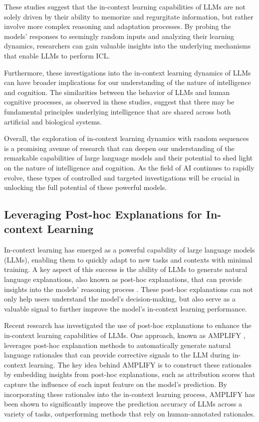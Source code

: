 \documentclass[11pt]{article}
\begin{document}
These studies suggest that the in-context learning capabilities of LLMs are not solely driven by their ability to memorize and regurgitate information, but rather involve more complex reasoning and adaptation processes. By probing the models' responses to seemingly random inputs and analyzing their learning dynamics, researchers can gain valuable insights into the underlying mechanisms that enable LLMs to perform ICL.

Furthermore, these investigations into the in-context learning dynamics of LLMs can have broader implications for our understanding of the nature of intelligence and cognition. The similarities between the behavior of LLMs and human cognitive processes, as observed in these studies, suggest that there may be fundamental principles underlying intelligence that are shared across both artificial and biological systems.

Overall, the exploration of in-context learning dynamics with random sequences is a promising avenue of research that can deepen our understanding of the remarkable capabilities of large language models and their potential to shed light on the nature of intelligence and cognition. As the field of AI continues to rapidly evolve, these types of controlled and targeted investigations will be crucial in unlocking the full potential of these powerful models.

\subsection{Leveraging Post-hoc Explanations for In-context Learning}

In-context learning has emerged as a powerful capability of large language models (LLMs), enabling them to quickly adapt to new tasks and contexts with minimal training. A key aspect of this success is the ability of LLMs to generate natural language explanations, also known as post-hoc explanations, that can provide insights into the models' reasoning process \cite{ref202,ref203}. These post-hoc explanations can not only help users understand the model's decision-making, but also serve as a valuable signal to further improve the model's in-context learning performance.

Recent research has investigated the use of post-hoc explanations to enhance the in-context learning capabilities of LLMs. One approach, known as AMPLIFY \cite{ref195}, leverages post-hoc explanation methods to automatically generate natural language rationales that can provide corrective signals to the LLM during in-context learning. The key idea behind AMPLIFY is to construct these rationales by embedding insights from post-hoc explanations, such as attribution scores that capture the influence of each input feature on the model's prediction. By incorporating these rationales into the in-context learning process, AMPLIFY has been shown to significantly improve the prediction accuracy of LLMs across a variety of tasks, outperforming methods that rely on human-annotated rationales.
\end{document}
